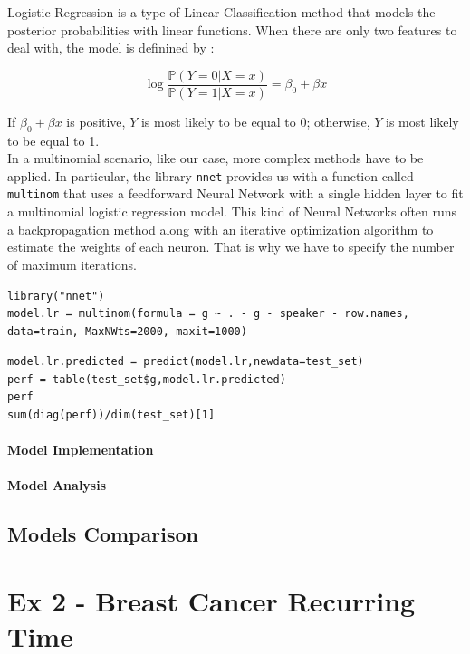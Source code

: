 \documentclass[]{report}
\begin{document}
Logistic Regression is a type of Linear Classification method that models the posterior probabilities with linear functions. When there are only two features to deal with, the model is definined by : 

$$
\log \frac{\mathbb{P}(Y = 0 | X = x)}{\mathbb{P}(Y = 1 | X = x)} = \beta_0 + \beta x
$$

If $\beta_0 + \beta x$ is positive, $Y$ is most likely to be equal to 0; otherwise, $Y$ is most likely to be equal to 1.  \\

In a multinomial scenario, like our case, more complex methods have to be applied. In particular, the library \texttt{nnet} provides us with a function called \texttt{multinom} that uses a feedforward Neural Network with a single hidden layer to fit a multinomial logistic regression model. This kind of Neural Networks often runs a backpropagation method along with an iterative optimization algorithm to estimate the weights of each neuron. That is why we have to specify the number of maximum iterations.

\begin{lstlisting}
library("nnet")
model.lr = multinom(formula = g ~ . - g - speaker - row.names, data=train, MaxNWts=2000, maxit=1000)
\end{lstlisting}

\begin{lstlisting}
model.lr.predicted = predict(model.lr,newdata=test_set)
perf = table(test_set$g,model.lr.predicted)
perf
sum(diag(perf))/dim(test_set)[1]
\end{lstlisting}
\subsubsection{Model Implementation}
\subsubsection{Model Analysis}


\section{Models Comparison}




\chapter{Ex 2 - Breast Cancer Recurring Time}
\end{document}
